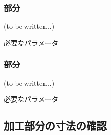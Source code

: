 \subsubsection{\EndFaceBoring 部分\TBW}
(to be written...)
\begin{Parameter}{必要なパラメータ}
\PMEndFaceBoringExists%
\PMEndFaceBoringCornerR%
\end{Parameter}

\subsubsection{\Inlay 部分\TBW}
(to be written...)
\begin{Parameter}{必要なパラメータ}
\PMInlayExists%
\end{Parameter}


\clearpage
\subsection{加工部分の寸法の確認}

